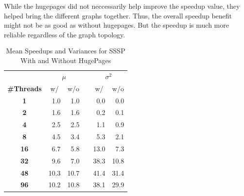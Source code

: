 While the hugepages did not neccessarily help improve the speedup value, they helped bring the different graphs together. Thus, the overall speedup benefit might not be as good as without hugepages. But the speedup is much more reliable regardless of the graph topology.

\begin{table}
\renewcommand{\arraystretch}{1.3}
\centering
\caption{Mean Speedups and Variances for SSSP With and Without HugePages}
\label{tbl:ssspMeansVariances}
\begin{tabular}{c@{\hskip 2\tabcolsep}rrc@{\hskip 2\tabcolsep}rr}
\toprule
&\multicolumn{2}{c}{\!\!\!$\mu$}&\enspace&\multicolumn{2}{c}{\!\!$\sigma^2$}\\
\cmidrule(r){2-3}\cmidrule(r){5-6}
{\bf\#Threads}&\multicolumn{1}{c}{w/}&\multicolumn{1}{c}{w/o}&\enspace&\multicolumn{1}{c}{w/}&\multicolumn{1}{c}{w/o}\\\midrule
\bf1 & 1.0 & 1.0 &\enspace& 0.0 & 0.0 \\
\bf2 & 1.6 & 1.6 &\enspace& 0.2 & 0.1 \\
\bf4 & 2.5 & 2.5 &\enspace& 1.1 & 0.9 \\
\bf8 & 4.5 & 3.4 &\enspace& 5.3 & 2.1 \\
\bf16 & 6.7 & 5.8 &\enspace& 13.0 & 7.3 \\
\bf32 & 9.6 & 7.0 &\enspace& 38.3 & 10.8 \\
\bf48 & 10.3 & 10.7 &\enspace& 41.4 & 31.4 \\
\bf96 & 10.2 & 10.8 &\enspace& 38.1 & 29.9 \\
\bottomrule
\end{tabular}
\end{table}



